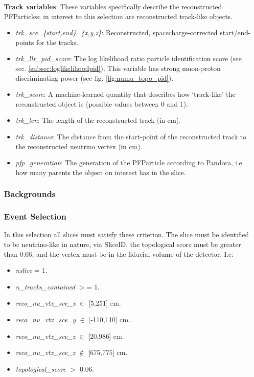 \par \noindent \textbf{Track variables}: These variables specifically describe the reconstructed PFParticles; in interest to this selection are reconstructed track-like objects. 
\begin{itemize}
    \item \emph{trk\_sce\_\{start,end\}\_\{x,y,z\}}: Reconstructed, spacecharge-corrected start/end-points for the tracks.
    \item \emph{trk\_llr\_pid\_score}: The log likelihood ratio particle identification score (see sec. \ref{subsec:loglikelihoodpid}). This variable has strong muon-proton discriminating power (see fig. \ref{fig:numu_topo_pid}).
    \item \emph{trk\_score}: A machine-learned quantity that describes how `track-like' the reconstructed object is (possible values between 0 and 1).
    \item \emph{trk\_len}: The length of the reconstructed track (in cm).
    \item \emph{trk\_distance}: The distance from the start-point of the reconstructed track to the reconstructed neutrino vertex (in cm).
    \item \emph{pfp\_generation}: The generation of the PFParticle according to Pandora, i.e. how many parents the object on interest has in the slice.
\end{itemize}

\subsubsection{Backgrounds}
\label{sssec:NuMUCCsel:sel:bkgrnds}

\subsubsection{Event Selection}
\label{sssec:NuMUCCsel:sel:evt}

\par In this selection all slices must satisfy these criterion. The slice must be identified to be neutrino-like in nature, via SliceID, the topological score must be greater than 0.06, and the vertex must be in the fiducial volume of the detector. I.e:

\begin{itemize}
    \item \emph{nslice} = 1.
    \item \emph{n\_tracks\_contained} $>$= 1.
    \item \emph{reco\_nu\_vtx\_sce\_x} $\in$ [5,251] cm.
    \item \emph{reco\_nu\_vtx\_sce\_y} $\in$ [-110,110] cm.
    \item \emph{reco\_nu\_vtx\_sce\_z} $\in$ [20,986] cm.
    \item \emph{reco\_nu\_vtx\_sce\_z} $\not\in$ [675,775] cm.
    \item \emph{topological\_score} $>$ 0.06.
\end{itemize}

